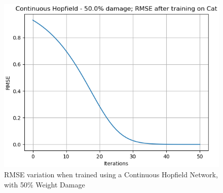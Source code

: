 \documentclass[12pt,a4paper]{article}
\begin{document}
\begin{figure}[H]
\includegraphics[scale=0.4]{images/chn_50_cat.png}
\caption{RMSE variation when trained using a Continuous Hopfield Network, with 50\% Weight Damage}
\end{figure}
\end{document}
